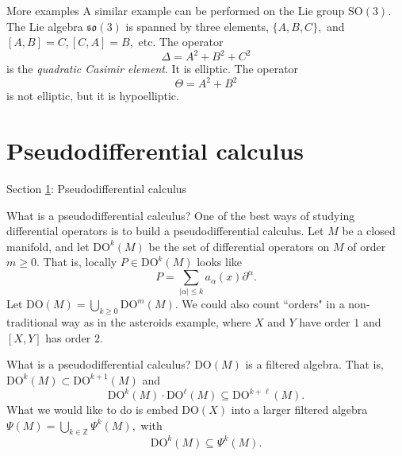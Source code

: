 \documentclass{beamer}
\numberwithin{equation}{section}
\theoremstyle{plain}
\theoremstyle{plain}
\theoremstyle{definition}
\theoremstyle{plain}
\theoremstyle{plain}
\theoremstyle{definition}
\newcommand{\Rl}{\mathbb{R}}
\newcommand{\Itgr}{\mathbb{Z}}
\begin{document}
\begin{frame}{More examples}
  A similar example can be performed on the Lie group $\mathrm{SO}(3).$ The Lie algebra $\mathfrak{so}(3)$
  is spanned by three elements, $\{A,B,C\},$ and $[A,B]=C, [C,A] = B,$ etc.
  \pause
  The operator
  \[
      \Delta = A^2+B^2+C^2
  \]
  is the \emph{quadratic Casimir element}. It is elliptic.
  \pause
  The operator
  \[
    \Theta = A^2+B^2
  \]
  is not elliptic, but it is hypoelliptic.
\end{frame}
% 
% 



\section{Pseudodifferential calculus}\label{psido_section}

\begin{frame}
    \huge{Section \ref{psido_section}: Pseudodifferential calculus}
\end{frame}

\begin{frame}{What is a pseudodifferential calculus?}
  One of the best ways of studying differential operators is to build a pseudodifferential calculus.
  \pause
  Let $M$ be a closed manifold, and let $\mathrm{DO}^k(M)$ be the set of differential operators on $M$
  of order $m\geq 0.$ That is, locally $P \in \mathrm{DO}^k(M)$ looks like
  \[
    P = \sum_{|\alpha|\leq k} a_{\alpha}(x)\partial^{\alpha}.
  \]
  Let $\mathrm{DO}(M) = \bigcup_{k\geq 0} \mathrm{DO}^m(M).$
  \pause
  We could also count ``orders" in a non-traditional way as in the asteroids example, where $X$ and $Y$ have order $1$ and $[X,Y]$ has order $2.$
\end{frame}

\begin{frame}{What is a pseudodifferential calculus?}
  $\mathrm{DO}(M)$ is a filtered algebra. That is, $\mathrm{DO}^{k}(M)\subset \mathrm{DO}^{k+1}(M)$ and
  \[
    \mathrm{DO}^k(M)\cdot \mathrm{DO}^\ell(M) \subseteq \mathrm{DO}^{k+\ell}(M).
  \]
  What we would like to do is embed $\mathrm{DO}(X)$ into a larger filtered algebra $\Psi(M)=\bigcup_{k\in \Itgr} \Psi^k(M),$ with
  \[
    \mathrm{DO}^k(M) \subseteq \Psi^k(M).
  \]
\end{frame}
\end{document}
